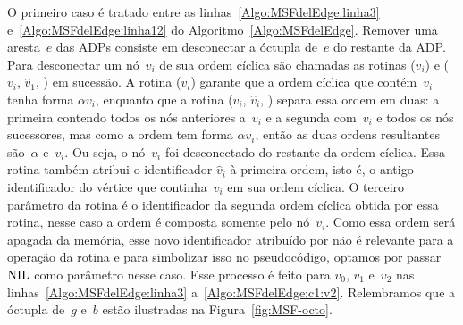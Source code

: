 O primeiro caso é tratado entre as linhas~\ref{Algo:MSFdelEdge:linha3} e~\ref{Algo:MSFdelEdge:linha12} do Algoritmo~\ref{Algo:MSFdelEdge}.
Remover uma aresta~$e$ das ADPs consiste em desconectar a óctupla de~$e$ do restante da ADP. 
Para desconectar um nó~$v_i$ de sua ordem cíclica são chamadas as rotinas \LCOCycle($v_i$) e \LCOSplit($v_i$, $\hat v_1$, \Nil) em sucessão.
A rotina \LCOCycle($v_i$) garante que a ordem cíclica que contém~$v_i$ tenha forma $\alpha v_i$, enquanto que a rotina \LCOSplit($v_i$, $\hat v_i$, \Nil) separa essa ordem em duas: a primeira contendo todos os nós anteriores a~$v_i$ e a segunda com~$v_i$ e todos os nós sucessores, mas como a ordem tem forma $\alpha v_i$, então as duas ordens resultantes são~$\alpha$ e~$v_i$.
Ou seja, o nó~$v_i$ foi desconectado do restante da ordem cíclica.
Essa rotina também atribui o identificador $\hat v_i$ à primeira ordem, isto é, o antigo identificador do vértice que continha~$v_i$ em sua ordem cíclica.
O terceiro parâmetro da rotina \LCOSplit{} é o identificador da segunda ordem cíclica obtida por essa rotina, nesse caso a ordem é composta somente pelo nó~$v_i$.
Como essa ordem será apagada da memória, esse novo identificador atribuído por \LCOSplit{} não é relevante para a operação da rotina \MSFdelEdge{} e para simbolizar isso no pseudocódigo, optamos por passar $\text{NIL}$ como parâmetro nesse caso.
Esse processo é feito para $v_0$, $v_1$ e~$v_2$ nas linhas~\ref{Algo:MSFdelEdge:linha3} a~\ref{Algo:MSFdelEdge:c1:v2}.
Relembramos que a óctupla de~$g$ e~$b$ estão ilustradas na Figura~\ref{fig:MSF-octo}.

